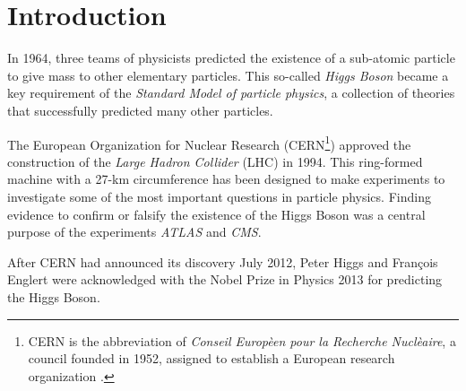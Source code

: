 \section{Introduction}\label{ch:intro}\raggedbottom
%
In 1964, three teams of physicists predicted the existence of a sub-atomic particle to give mass to other elementary particles. This so-called \emph{Higgs Boson} became a key requirement of the \emph{Standard Model of particle physics}, a collection of theories that successfully predicted many other particles.

The European Organization for Nuclear Research (CERN\footnote{CERN is the abbreviation of \emph{Conseil Europ\`een pour la Recherche Nucl\`eaire}, a council founded in 1952, assigned to establish a European research organization \cite{cernHP}.}) approved the construction of the \emph{Large Hadron Collider} (LHC) in 1994. This ring-formed machine with a  27-km circumference has been designed to make experiments to investigate some of the most important questions in particle physics. Finding evidence to confirm or falsify the existence of the Higgs Boson was a central purpose of the experiments \emph{ATLAS} and \emph{CMS}.

After CERN had announced its discovery July 2012, Peter Higgs and Fran\c{c}ois Englert were acknowledged with the Nobel Prize in Physics 2013 for predicting the Higgs Boson.

